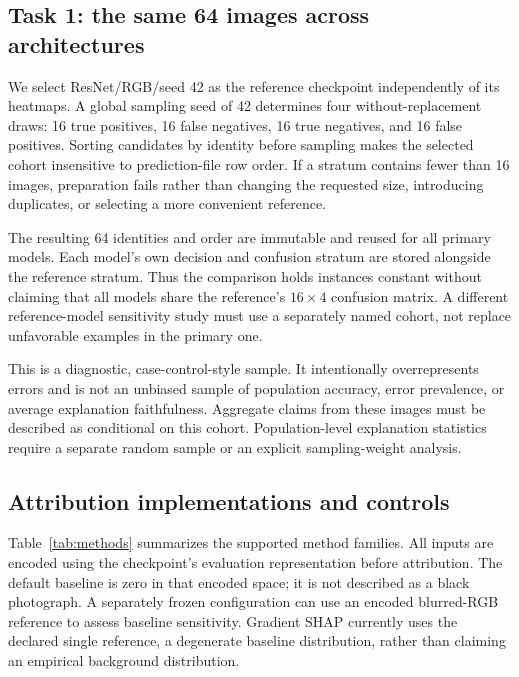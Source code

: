 \documentclass{article}
\begin{document}
\subsection{Task 1: the same 64 images across architectures}
We select ResNet/RGB/seed 42 as the reference checkpoint independently of its heatmaps. A global sampling seed of 42 determines four without-replacement draws: 16 true positives, 16 false negatives, 16 true negatives, and 16 false positives. Sorting candidates by identity before sampling makes the selected cohort insensitive to prediction-file row order. If a stratum contains fewer than 16 images, preparation fails rather than changing the requested size, introducing duplicates, or selecting a more convenient reference.

The resulting 64 identities and order are immutable and reused for all primary models. Each model's own decision and confusion stratum are stored alongside the reference stratum. Thus the comparison holds instances constant without claiming that all models share the reference's $16\times4$ confusion matrix. A different reference-model sensitivity study must use a separately named cohort, not replace unfavorable examples in the primary one.

This is a diagnostic, case-control-style sample. It intentionally overrepresents errors and is not an unbiased sample of population accuracy, error prevalence, or average explanation faithfulness. Aggregate claims from these images must be described as conditional on this cohort. Population-level explanation statistics require a separate random sample or an explicit sampling-weight analysis.

\subsection{Attribution implementations and controls}
Table~\ref{tab:methods} summarizes the supported method families. All inputs are encoded using the checkpoint's evaluation representation before attribution. The default baseline is zero in that encoded space; it is not described as a black photograph. A separately frozen configuration can use an encoded blurred-RGB reference to assess baseline sensitivity. Gradient SHAP currently uses the declared single reference, a degenerate baseline distribution, rather than claiming an empirical background distribution.
\end{document}
